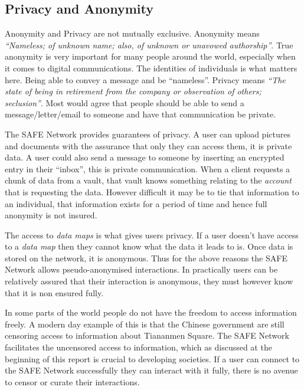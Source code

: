 \subsection{Privacy and Anonymity}

Anonymity and Privacy are not mutually exclusive. Anonymity means \textit{``Nameless; of unknown name; also, of unknown or unavowed authorship''}\cite{anonymous}. True anonymity is very important for many people around the world, especially when it comes to digital communications. The identities of individuals is what matters here. Being able to convey a message and be ``nameless''. Privacy means \textit{``The state of being in retirement from the company or observation of others; seclusion''}\cite{privacy}. Most would agree that people should be able to send a message/letter/email to someone and have that communication be private.

The SAFE Network provides guarantees of privacy. A user can upload pictures and documents with the assurance that only they can access them, it is private data. A user could also send a message to someone by inserting an encrypted entry in their ``inbox'', this is private communication. When a client requests a chunk of data from a vault, that vault knows something relating to the \textit{account} that is requesting the data. However difficult it may be to tie that information to an individual, that information exists for a period of time and hence full anonymity is not insured.

The access to \textit{data maps} is what gives users privacy. If a user doesn't have access to a \textit{data map} then they cannot know what the data it leads to is. Once data is stored on the network, it is anonymous. Thus for the above reasons the SAFE Network allows pseudo-anonymised interactions. In practically users can be relatively assured that their interaction is anonymous, they must however know that it is non ensured fully.

In some parts of the world people do not have the freedom to access information freely. A modern day example of this is that the Chinese government are still censoring access to information about Tiananmen Square\cite{tiananmen-square}. The SAFE Network facilitates the uncensored access to information, which as discussed at the beginning of this report is crucial to developing societies. If a user can connect to the SAFE Network successfully they can interact with it fully, there is no avenue to censor or curate their interactions.

